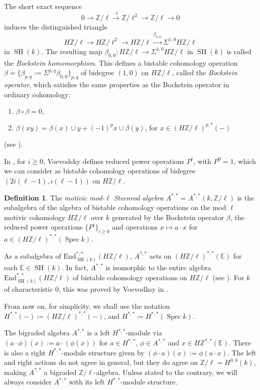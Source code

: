 \documentclass[10pt]{amsart}
\theoremstyle{definition}
\newtheorem{defn}{Definition}[section]
\theoremstyle{plain}
\numberwithin{equation}{section}
\newcommand{\0}{\emptyset}
\newcommand{\E}{{\mathbb E}}
\newcommand{\Z}{{\mathbb Z}}
\newcommand{\Spec}{{\operatorname{Spec}}}
\newcommand{\SH}{{\operatorname{SH}}}
\begin{document}
The short exact sequence
$$0 \to \Z/\ell \xrightarrow{\cdot \ell} \Z /\ell^2 \to \Z/\ell \to 0$$
induces the distinguished triangle
\begin{equation}
    \label{eq:Bockstein}
    H\Z/\ell \to H\Z/\ell^2\to  H\Z/\ell \xrightarrow{\beta_{0,0}} \Sigma^{1,0}H\Z/\ell
\end{equation}
in $\SH(k)$. The resulting map $\beta_{0,0}:H\Z/\ell\to \Sigma^{1,0}H\Z/\ell$ in $\SH(k)$ is called the \emph{Bockstein homomorphism}. This defines a bistable cohomology operation $\beta=\{\beta_{p,q}:=\Sigma^{p,q}\beta_{0,0}\}_{p,q}$ of bidegree $(1,0)$ on $H\Z/\ell$, called the \emph{Bockstein operator}, which satisfies the same properties as the Bockstein operator in ordinary cohomology:
\begin{enumerate}
    \item $\beta \circ \beta = 0,$
    \item $\beta (xy)=\beta(x)\cup y + (-1)^p x \cup \beta(y)$, for $x \in (H\Z/\ell)^{p,*}(-)$ 
\end{enumerate}
(see \cite[Section 8]{Voev-power}).

In \cite[Section 9]{Voev-power}, for $i \ge 0$, Voevodsky defines reduced power operations $P^i$, with $P^0=1$, which we can consider as bistable cohomology operations of bidegree $(2i(\ell-1),i(\ell-1))$ on $H\Z/\ell$. 

\begin{defn}
    The \emph{motivic mod-$\ell$ Steenrod algebra} $A^{*,*}=A^{*,*}(k,\Z/\ell)$ is the subalgebra of the algebra of bistable cohomology operations on the mod $\ell$ motivic cohomology $H\Z/\ell$ over $k$ generated by the Bockstein operator $\beta$, the reduced power operations $\{P^i\}_{i \ge0}$ and operations $x \mapsto a \cdot x$ for $a \in (H\Z/\ell)^{*,*}(\Spec k)$.
\end{defn}

As a subalgebra of $\text{End}_{\SH(k)}^{*,*}(H\Z/\ell)$, $A^{*,*}$ acts on $(H\Z/\ell)^{*,*}(\E)$ for each $\E \in \SH(k)$. In fact, $A^{*,*}$ is isomorphic to the entire algebra $\text{End}_{\SH(k)}^{*,*}(H\Z/\ell)$ of bistable cohomology operations on $H\Z/\ell$ (see \cite[Therem 1.1 (1)]{Hoy:Steenrod}). For $k$ of characteristic $0$, this was proved by Voevodksy in \cite[Theorem 3.49]{Voe:EM}.

From now on, for simplicity, we shall use the notation $H^{*,*}(-) \coloneqq (H\Z/\ell)^{*,*}(-)$, and $H^{*,*} \coloneqq H^{*,*}(\Spec k)$.

The bigraded algebra $A^{*,*}$ is a left $H^{*,*}$-module via $(a\cdot\phi)(x):=a\cdot(\phi(x))$ for $a\in H^{*,*}$, $\phi\in A^{*,*}$ and $x\in H\Z^{*,*}(\E)$. There is also a right $H^{*,*}$-module structure given by $(\phi\cdot a)(x):=\phi(a\cdot x)$. The left and right actions do not agree in general, but they do agree on $\Z/\ell=H^{0,0}(k)$, making $A^{*,*}$ a bigraded $\Z/\ell$-algebra. Unless stated to the contrary, we will always consider $A^{*,*}$ with its left $H^{*,*}$-module structure.
\end{document}
